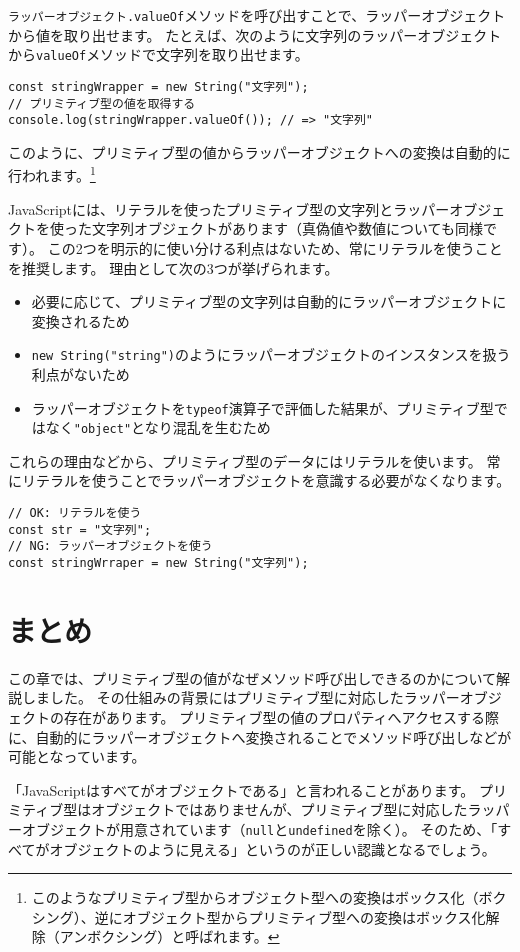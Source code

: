 \texttt{ラッパーオブジェクト.valueOf}メソッドを呼び出すことで、ラッパーオブジェクトから値を取り出せます。
たとえば、次のように文字列のラッパーオブジェクトから\texttt{valueOf}メソッドで文字列を取り出せます。

\begin{lstlisting}
const stringWrapper = new String("文字列");
// プリミティブ型の値を取得する
console.log(stringWrapper.valueOf()); // => "文字列"
\end{lstlisting}

このように、プリミティブ型の値からラッパーオブジェクトへの変換は自動的に行われます。\footnote{このようなプリミティブ型からオブジェクト型への変換はボックス化（ボクシング）、逆にオブジェクト型からプリミティブ型への変換はボックス化解除（アンボクシング）と呼ばれます。}

JavaScriptには、リテラルを使ったプリミティブ型の文字列とラッパーオブジェクトを使った文字列オブジェクトがあります（真偽値や数値についても同様です）。
この2つを明示的に使い分ける利点はないため、常にリテラルを使うことを推奨します。
理由として次の3つが挙げられます。

\begin{itemize}
\item
  必要に応じて、プリミティブ型の文字列は自動的にラッパーオブジェクトに変換されるため
\item
  \texttt{new String("string")}のようにラッパーオブジェクトのインスタンスを扱う利点がないため
\item
  ラッパーオブジェクトを\texttt{typeof}演算子で評価した結果が、プリミティブ型ではなく\texttt{"object"}となり混乱を生むため
\end{itemize}

これらの理由などから、プリミティブ型のデータにはリテラルを使います。
常にリテラルを使うことでラッパーオブジェクトを意識する必要がなくなります。

\begin{lstlisting}
// OK: リテラルを使う
const str = "文字列";
// NG: ラッパーオブジェクトを使う
const stringWrraper = new String("文字列");
\end{lstlisting}

\hypertarget{wrapper-object-summary}{%
\section{まとめ}\label{wrapper-object-summary}}

この章では、プリミティブ型の値がなぜメソッド呼び出しできるのかについて解説しました。
その仕組みの背景にはプリミティブ型に対応したラッパーオブジェクトの存在があります。
プリミティブ型の値のプロパティへアクセスする際に、自動的にラッパーオブジェクトへ変換されることでメソッド呼び出しなどが可能となっています。

「JavaScriptはすべてがオブジェクトである」と言われることがあります。
プリミティブ型はオブジェクトではありませんが、プリミティブ型に対応したラッパーオブジェクトが用意されています（\texttt{null}と\texttt{undefined}を除く）。
そのため、「すべてがオブジェクトのように見える」というのが正しい認識となるでしょう。
